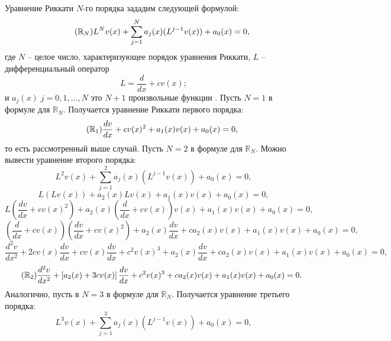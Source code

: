Уравнение Риккати $N$-го порядка зададим следующей формулой:
\begin{equation}
    \tag{$\mathbb{R}_N$}
    L^N v(x) + \sum\limits_{j=1}^N a_j(x)(L^{j - 1} v(x)) + a_0(x) = 0,
\end{equation}
где $N$ -- целое число, характеризующее порядок уравнения Риккати, $L$ -- дифференциальный оператор
$$L = \dfrac{d}{dx} + c v(x);$$
и $a_j(x) \; j = 0, 1, \dots, N$ это $N + 1$ произвольные функции \cite{chain}. Пусть $N = 1$ в формуле для $\mathbb{R}_N$. Получается уравнение Риккати первого порядка:
\begin{equation}
    \tag{$\mathbb{R}_1$}
    \dfrac{dv}{dx} + c v(x)^2 + a_1(x) v(x) + a_0(x) = 0,
\end{equation}
то есть рассмотренный выше случай.
Пусть $N = 2$ в формуле для $\mathbb{R}_N$. Можно вывести уравнение второго порядка:
$$L^2 v(x) + \sum\limits_{j=1}^2 a_j(x)(L^{j - 1} v(x)) + a_0(x) = 0,$$
$$L \left( L v(x) \right) + a_2(x) L v(x) + a_1(x) v(x) + a_0(x) = 0,$$
$$ L\left(\dfrac{dv}{dx} + cv(x)^2\right) + a_2(x) \left(\dfrac{d}{dx} + c v(x)\right) v(x) + a_1(x) v(x) + a_0(x) = 0,$$
$$ \left(\dfrac{d}{dx} + c v(x)\right)\left(\dfrac{dv}{dx} + cv(x)^2\right) + a_2(x) \dfrac{dv}{dx} + c a_2(x) v(x) + a_1(x) v(x) + a_0(x) = 0,$$
$$ \dfrac{d^2v}{dx^2} + 2c v(x) \dfrac{dv}{dx} + c v(x) \dfrac{dv}{dx} + c^2 v(x)^3 + a_2(x) \dfrac{dv}{dx} + c a_2(x) v(x) +  a_1(x) v(x) + a_0(x) = 0,$$
\begin{equation}
    \tag{$\mathbb{R}_2$}
    \dfrac{d^2v}{dx^2} + \left[ a_2(x) + 3c v(x) \right] \dfrac{dv}{dx} + c^2 v(x)^3 + c a_2(x) v(x) + a_1(x) v(x) + a_0(x) = 0.
\end{equation}
Аналогично, пусть в $N = 3$ в формуле для $\mathbb{R}_N$. Получается уравнение третьего порядка:
$$L^3 v(x) + \sum\limits_{j=1}^3 a_j(x)(L^{j - 1} v(x)) + a_0(x) = 0,$$
